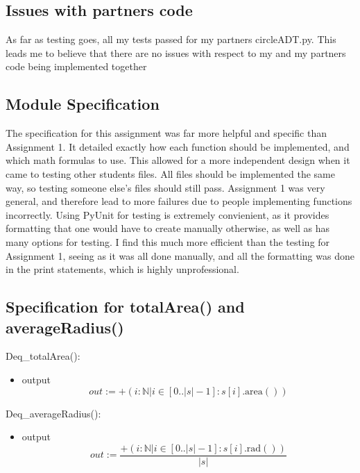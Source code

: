 \documentclass[12pt]{article}
\begin{document}
\subsection{Issues with partners code}
As far as testing goes, all my tests passed for my partners circleADT.py. This leads me to believe that there are no issues 
with respect to my and my partners code being implemented together


\subsection{Module Specification}
The specification for this assignment was far more helpful and specific than Assignment 1. It detailed exactly how each function
should be implemented, and which math formulas to use. This allowed for a more independent design when it came to testing other students files. All files should be implemented the same way, so testing someone else's files should still pass. Assignment 1
was very general, and therefore lead to more failures due to people implementing functions incorrectly.
Using PyUnit for testing is extremely convienient, as it provides formatting that one would have to create manually otherwise,
as well as has many options for testing. I find this much more efficient than the testing for Assignment 1, seeing as it was all done
manually, and all the formatting was done in the print statements, which is highly unprofessional.


\subsection{Specification for totalArea() and averageRadius()}
\noindent Deq\_totalArea():
\begin{itemize}
\item output $$out := +(i: \mathbb{N} | i \in [0 .. |s|-1]:s[i].\mbox{area}())$$
\end{itemize}

\noindent Deq\_averageRadius():
\begin{itemize}
\item output $$out := \frac{+(i: \mathbb{N} | i \in [0 .. |s|-1]:s[i].\mbox{rad}())}{|s|}$$
\end{itemize}
\end{document}
